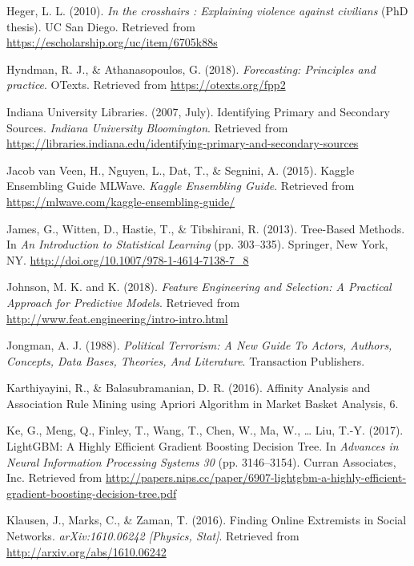 \documentclass[11pt,oneside,a4paper]{reedthesis}
\begin{document}
\hypertarget{ref-Heger_2010}{}
Heger, L. L. (2010). \emph{In the crosshairs : Explaining violence
against civilians} (PhD thesis). UC San Diego. Retrieved from
\url{https://escholarship.org/uc/item/6705k88s}

\hypertarget{ref-Hyndman_2018}{}
Hyndman, R. J., \& Athanasopoulos, G. (2018). \emph{Forecasting:
Principles and practice}. OTexts. Retrieved from
\url{https://otexts.org/fpp2}

\hypertarget{ref-IndianaUniversityLibraries_2007}{}
Indiana University Libraries. (2007, July). Identifying Primary and
Secondary Sources. \emph{Indiana University Bloomington}. Retrieved from
\url{https://libraries.indiana.edu/identifying-primary-and-secondary-sources}

\hypertarget{ref-JacobvanVeen_2015}{}
Jacob van Veen, H., Nguyen, L., Dat, T., \& Segnini, A. (2015). Kaggle
Ensembling Guide \textbar{} MLWave. \emph{Kaggle Ensembling Guide}.
Retrieved from \url{https://mlwave.com/kaggle-ensembling-guide/}

\hypertarget{ref-James_2013}{}
James, G., Witten, D., Hastie, T., \& Tibshirani, R. (2013). Tree-Based
Methods. In \emph{An Introduction to Statistical Learning} (pp.
303--335). Springer, New York, NY.
\url{http://doi.org/10.1007/978-1-4614-7138-7_8}

\hypertarget{ref-Johnson_2018}{}
Johnson, M. K. and K. (2018). \emph{Feature Engineering and Selection: A
Practical Approach for Predictive Models}. Retrieved from
\url{http://www.feat.engineering/intro-intro.html}

\hypertarget{ref-Jongman_1988}{}
Jongman, A. J. (1988). \emph{Political Terrorism: A New Guide To Actors,
Authors, Concepts, Data Bases, Theories, And Literature}. Transaction
Publishers.

\hypertarget{ref-Karthiyayini_2016}{}
Karthiyayini, R., \& Balasubramanian, D. R. (2016). Affinity Analysis
and Association Rule Mining using Apriori Algorithm in Market Basket
Analysis, 6.

\hypertarget{ref-NIPS2017_6907}{}
Ke, G., Meng, Q., Finley, T., Wang, T., Chen, W., Ma, W., \ldots{} Liu,
T.-Y. (2017). LightGBM: A Highly Efficient Gradient Boosting Decision
Tree. In \emph{Advances in Neural Information Processing Systems 30}
(pp. 3146--3154). Curran Associates, Inc. Retrieved from
\url{http://papers.nips.cc/paper/6907-lightgbm-a-highly-efficient-gradient-boosting-decision-tree.pdf}

\hypertarget{ref-Klausen_2016}{}
Klausen, J., Marks, C., \& Zaman, T. (2016). Finding Online Extremists
in Social Networks. \emph{arXiv:1610.06242 {[}Physics, Stat{]}}.
Retrieved from \url{http://arxiv.org/abs/1610.06242}
\end{document}
